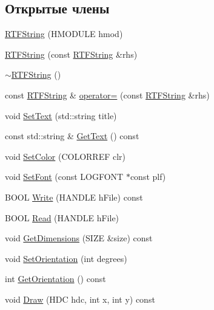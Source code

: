\subsection*{Открытые члены}
\begin{DoxyCompactItemize}
\item 
\hyperlink{class_r_t_f_string_a51863fc1577a626c5a4ccb15e6764073}{R\-T\-F\-String} (H\-M\-O\-D\-U\-L\-E hmod)
\item 
\hyperlink{class_r_t_f_string_a018b3244fc6039305ce5407936a9992e}{R\-T\-F\-String} (const \hyperlink{class_r_t_f_string}{R\-T\-F\-String} \&rhs)
\item 
\hyperlink{class_r_t_f_string_a63309fd7a3d4189fa2b6d2525d718d42}{$\sim$\-R\-T\-F\-String} ()
\item 
const \hyperlink{class_r_t_f_string}{R\-T\-F\-String} \& \hyperlink{class_r_t_f_string_a2e4c798c305f06b68fdbd5a5d91f0c8a}{operator=} (const \hyperlink{class_r_t_f_string}{R\-T\-F\-String} \&rhs)
\item 
void \hyperlink{class_r_t_f_string_aa011f163ea938fd7c24dc55001afa34b}{Set\-Text} (std\-::string title)
\item 
const std\-::string \& \hyperlink{class_r_t_f_string_a0847a69aa9573d5b298c2b181f98450c}{Get\-Text} () const 
\item 
void \hyperlink{class_r_t_f_string_af5be9c1a74068a8d1f805e093451be51}{Set\-Color} (C\-O\-L\-O\-R\-R\-E\-F clr)
\item 
void \hyperlink{class_r_t_f_string_ae7130e8d2df43ae9b821fe70804f1e4c}{Set\-Font} (const L\-O\-G\-F\-O\-N\-T $\ast$const plf)
\item 
B\-O\-O\-L \hyperlink{class_r_t_f_string_a63a4f84996a98bd0f1901eff5017fbb2}{Write} (H\-A\-N\-D\-L\-E h\-File) const 
\item 
B\-O\-O\-L \hyperlink{class_r_t_f_string_aa91f1cca43e34327c3ffabdd6c928871}{Read} (H\-A\-N\-D\-L\-E h\-File)
\item 
void \hyperlink{class_r_t_f_string_a1095cfa000481881825a6973506cdcc9}{Get\-Dimensions} (S\-I\-Z\-E \&size) const 
\item 
void \hyperlink{class_r_t_f_string_a8d9b2138da58d424b9bc8df251468b2e}{Set\-Orientation} (int degrees)
\item 
int \hyperlink{class_r_t_f_string_a04121663e4ab24711fe949750dc2b5ee}{Get\-Orientation} () const 
\item 
void \hyperlink{class_r_t_f_string_a45a11ee69611ed59989989b2d39133b8}{Draw} (H\-D\-C hdc, int x, int y) const 
\end{DoxyCompactItemize}
